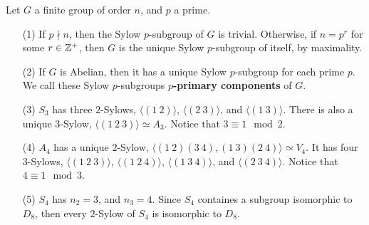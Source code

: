 \begin{example}\label{example_4.13}
  Let $G$ a finite group of order $n$, and  $p$ a prime.
  \begin{enumerate}
    \item[(1)] If $p \nmid n$, then the Sylow $p$-subgroup of $G$ is
      trivial. Otherwise, if  $n=p^r$ for some  $r \in \mathbb{Z}^+$, then $G$ is
      the unique Sylow $p$-subgroup of itself, by maximality.

    \item[(2)] If $G$ is Abelian, then it has a unique Sylow $p$-subgroup
      for each prime $p$. We call these Sylow $p$-subgroups
      \textbf{$p$-primary components} of $G$.

    \item[(3)] $S_3$ has three $2$-Sylows, $\langle (1 \ 2) \rangle$,
      $\langle (2 \ 3) \rangle$, and  $\langle (1 \ 3) \rangle$. There is
      also a unique $3$-Sylow,  $\langle (1 \ 2 \ 3) \rangle \simeq A_3$.
      Notice that $3 \equiv 1 \mod{2}$.

    \item[(4)] $A_4$ has a unique $2$-Sylow,  $\langle (1 \ 2)(3 \ 4),
      (1 \ 3)(2 \ 4) \rangle \simeq V_4$. It has four $3$-Sylows,
      $\langle (1 \ 2 \ 3) \rangle$, $\langle (1 \ 2 \ 4) \rangle$, $\langle
      (1 \ 3 \ 4) \rangle$, and $\langle (2 \ 3 \ 4) \rangle$. Notice that
      $4 \equiv 1 \mod{3}$.

    \item[(5)] $S_4$ has $n_2=3$, and  $n_3=4$. Since $S_4$ containes a
      subgroup isomorphic to $D_8$, then every $2$-Sylow of $S_4$ is
      isomorphic to $D_8$.
  \end{enumerate}
\end{example}
